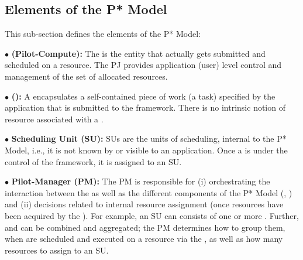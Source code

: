\documentclass[conference]{IEEEtran}
\begin{document}


%

\noindent 
\subsection{Elements of the P* Model}

\noindent This sub-section defines the elements of the P* Model:

\noindent$\bullet$ \textbf{\pilot (Pilot-Compute):} The \pilot is the
entity that actually gets submitted and scheduled on a resource.  The
PJ  provides
application (user) level control and management of the set of
allocated resources.

\noindent$\bullet$ \textbf{\computeunit  (\cu):} A \cu  encapsulates a 
  self-contained piece of work (a task) specified by the application that is
  submitted to the \pilotjob framework. There is no intrinsic notion
  of resource associated with a \cu.

\noindent$\bullet$ \textbf{Scheduling Unit (SU):} SUs are the units of 
  scheduling, internal to the P* Model, i.e., it is not known by or
  visible to an application. Once a \cu is
  under the control of the \pilotjob framework, it is assigned
  to an SU.

\noindent$\bullet$ \textbf{Pilot-Manager (PM):} The PM is responsible for (i)
  orchestrating the interaction between the \pilots as well as the
  different components of the P* Model (\cus, \sus) and (ii) decisions
  related to internal resource assignment (once resources have been
  acquired by the \pilotjob).  For example, an SU can consists of one
  or more \cus. Further, \cus and \sus can be combined and aggregated;
  the PM determines how to group them, when \sus are scheduled and
  executed on a resource via the \pilot, as well as how many resources
  to assign to an SU.
\end{document}
